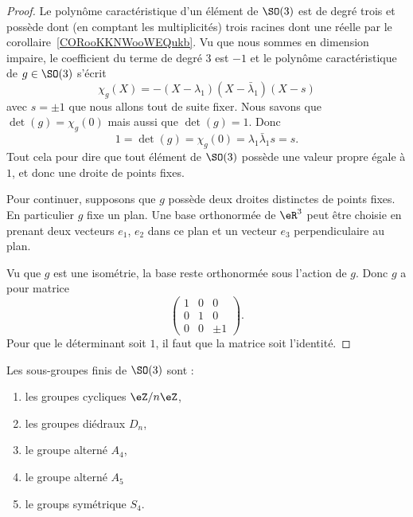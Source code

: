 \begin{proof}
    Le polynôme caractéristique d'un élément de \( \SO(3)\) est de degré trois et possède dont (en comptant les multiplicités) trois racines dont une réelle par le corollaire~\ref{CORooKKNWooWEQukb}. Vu que nous sommes en dimension impaire, le coefficient du terme de degré \( 3\) est \( -1\) et le polynôme caractéristique de \( g\in\SO(3)\) s'écrit
    \begin{equation}
        \chi_g(X)=-(X-\lambda_1)(X-\bar\lambda_1)(X-s)
    \end{equation}
    avec \( s=\pm1 \) que nous allons tout de suite fixer. Nous savons que \( \det(g)=\chi_g(0)\) mais aussi que \( \det(g)=1\). Donc
    \begin{equation}
        1=\det(g)=\chi_g(0)=\lambda_1\bar\lambda_1 s=s.
    \end{equation}
    Tout cela pour dire que tout élément de \( \SO(3)\) possède une valeur propre égale à \( 1\), et donc une droite de points fixes.

    Pour continuer, supposons que \( g\) possède deux droites distinctes de points fixes. En particulier \( g\) fixe un plan. Une base orthonormée de \( \eR^3\) peut être choisie en prenant deux vecteurs \( e_1\), \( e_2\) dans ce plan et un vecteur \( e_3\) perpendiculaire au plan.

    Vu que \( g\) est une isométrie, la base reste orthonormée sous l'action de \( g\). Donc \( g\) a pour matrice
    \begin{equation}
        \begin{pmatrix}
            1    &   0    &   0    \\
            0    &   1    &   0    \\
            0    &   0    &   \pm 1
        \end{pmatrix}.
    \end{equation}
    Pour que le déterminant soit \( 1\), il faut que la matrice soit l'identité.
\end{proof}

\begin{proposition}
    Les sous-groupes finis de \( \SO(3)\) sont :
    \begin{multicols}{2}
        \begin{enumerate}
            \item
                les groupes cycliques \( \eZ/n\eZ\),
            \item
                les groupes diédraux \( D_n\),
            \item
                le groupe alterné \( A_4\),
            \item
                le groupe alterné \( A_5\)
            \item
                le groups symétrique \( S_4\).
        \end{enumerate}
    \end{multicols}
\end{proposition}

